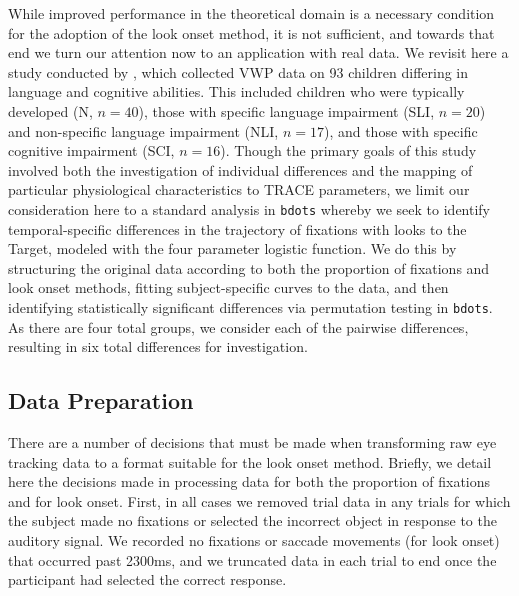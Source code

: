 \documentclass{article}
\newcommand{\xt}{\texttt}
\begin{document}
While improved performance in the theoretical domain is a necessary condition for the adoption of the look onset method, it is not sufficient, and towards that end we turn our attention now to an application with real data. We revisit here a study conducted by \cite{mcmurray2010individual}, which collected VWP data on 93 children differing in language and cognitive abilities. This included children who were typically developed (N, $n = 40$), those with specific language impairment (SLI, $n = 20$) and non-specific language impairment (NLI, $n = 17$), and those with specific cognitive impairment (SCI, $n = 16$). Though the primary goals of this study involved both the investigation of individual differences and the mapping of particular physiological characteristics to TRACE parameters, we limit our consideration here to a standard analysis in \xt{bdots} whereby we seek to identify temporal-specific differences in the trajectory of fixations with looks to the Target, modeled with the four parameter logistic function. We do this by structuring the original data according to both the proportion of fixations and look onset methods, fitting subject-specific curves to the data, and then identifying statistically significant differences via permutation testing in \xt{bdots}. As there are four total groups, we consider each of the pairwise differences, resulting in six total differences for investigation.

\subsection{Data Preparation}

There are a number of decisions that must be made when transforming raw eye tracking data to a format suitable for the look onset method. Briefly, we detail here the decisions made in processing data for both the proportion of fixations and for look onset. First, in all cases we removed trial data in any trials for which the subject made no fixations or selected the incorrect object in response to the auditory signal. We recorded no fixations or saccade movements (for look onset) that occurred past 2300ms, and we truncated data in each trial to end once the participant had selected the correct response.
\end{document}
